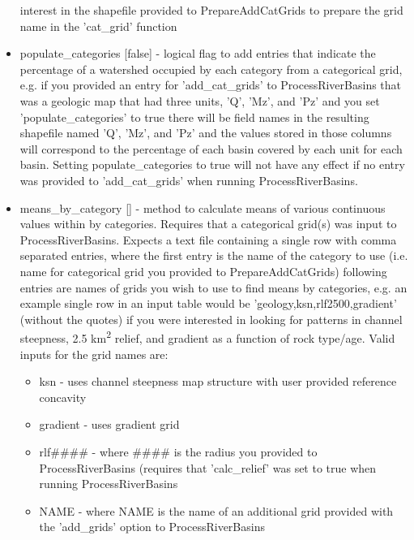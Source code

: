 \begin{itemize}
interest in the shapefile provided to PrepareAddCatGrids to prepare the grid name in the 'cat\_grid' function
\item populate\_categories [false] - logical flag to add entries that indicate the percentage of a watershed occupied by each category from a categorical grid, e.g. if you
provided an entry for 'add\_cat\_grids' to ProcessRiverBasins that was a geologic map that had three units, 'Q', 'Mz', and 'Pz' and you set 'populate\_categories' 
to true there will be field names in the resulting shapefile named 'Q', 'Mz', and 'Pz' and the values stored in those columns will correspond to the percentage 
of each basin covered by each unit for each basin. Setting populate\_categories to true will not have any effect if no entry was provided to 'add\_cat\_grids' when
running ProcessRiverBasins.
\item means\_by\_category [] - method to calculate means of various continuous values within by categories. Requires that a categorical grid(s) was input to ProcessRiverBasins.
Expects a text file containing a single row with comma separated entries, where the first entry is the name of the category to use (i.e. name for categorical grid 
you provided to PrepareAddCatGrids) following entries are names of grids you wish to use to find means by categories, e.g. an example single row in an input table 
would be 'geology,ksn,rlf2500,gradient' (without the quotes) if you were interested in looking for patterns in channel steepness, 2.5 km\textsuperscript{2} relief, and gradient as 
a function of rock type/age. Valid inputs for the grid names are:
\begin{itemize}
\item ksn - uses channel steepness map structure with user provided reference concavity
\item gradient - uses gradient grid
\item rlf\#\#\#\# - where \#\#\#\# is the radius you provided to ProcessRiverBasins (requires that 'calc\_relief' was set to true when running ProcessRiverBasins
\item NAME - where NAME is the name of an additional grid provided with the 'add\_grids' option to ProcessRiverBasins
\end{itemize}
\end{itemize}


